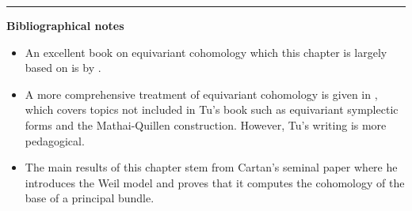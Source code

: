 \vspace{5mm}
\hrule 
\vspace{5mm}

\textbf{Bibliographical notes}
{\small
\begin{itemize}
	\item An excellent book on equivariant cohomology which this chapter is
	largely based on is  by
	\citet{equivariant_tu}.  
	\item A more comprehensive treatment of equivariant cohomology is given in
	\citet{guillemin}, which covers topics not included in Tu's book such as 
	equivariant symplectic forms and the Mathai-Quillen construction. 
	However, Tu's writing is more pedagogical.
	\item The main results of this chapter stem from Cartan's seminal paper 
	\cite{cartan} where he introduces the Weil model and proves that it computes
	the cohomology of the base of a principal bundle.
\end{itemize}
}

